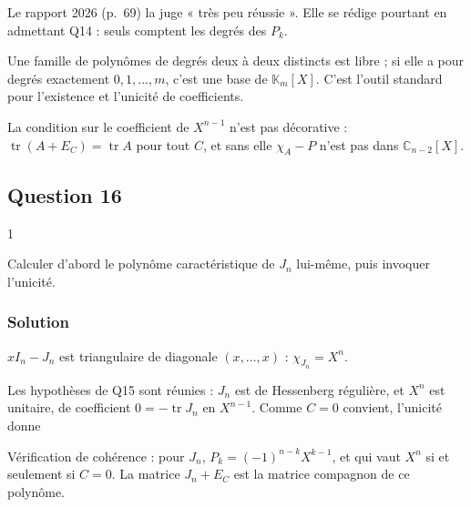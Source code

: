 \documentclass[11pt,a4paper]{article}
\newcommand{\equationajustee}[1]{%
  \sbox{\boiteequation}{$\displaystyle #1$}%
  \ifdim\wd\boiteequation>\linewidth
    \[\resizebox{\linewidth}{!}{\usebox{\boiteequation}}\]%
  \else
    \[#1\]%
  \fi}
\begin{document}
\begin{jury}

Le rapport 2026 (p.~69) la juge « très peu réussie ». Elle se rédige pourtant en admettant Q14 : seuls comptent les degrés des \(P_k\).

\end{jury}

\begin{methode}

Une famille de polynômes de degrés deux à deux distincts est libre ; si elle a pour degrés exactement \(0,1,\dots,m\), c'est une base de \(\mathbb K_m[X]\). C'est l'outil standard pour l'existence et l'unicité de coefficients.

\end{methode}

\begin{piege}

La condition sur le coefficient de \(X^{n-1}\) n'est pas décorative : \(\operatorname{tr}(A+E_C)=\operatorname{tr}A\) pour tout \(C\), et sans elle \(\chi_A-P\) n'est pas dans \(\mathbb C_{n-2}[X]\).

\end{piege}

\hypertarget{question-16}{%
\subsection{Question 16}\label{question-16}}

\begin{indication}{1}

Calculer d'abord le polynôme caractéristique de \(J_n\) lui-même, puis invoquer l'unicité.

\end{indication}

\hypertarget{solution-15}{%
\subsubsection{Solution}\label{solution-15}}

\(xI_n-J_n\) est triangulaire de diagonale \((x,\dots,x)\) : \(\chi_{J_n}=X^n\).

Les hypothèses de Q15 sont réunies : \(J_n\) est de Hessenberg régulière, et \(X^n\) est unitaire, de coefficient \(0=-\operatorname{tr}J_n\) en \(X^{n-1}\). Comme \(C=0\) convient, l'unicité donne
\equationajustee{\boxed{C=0.}}

Vérification de cohérence : pour \(J_n\), \(P_k=(-1)^{n-k}X^{k-1}\), et
\equationajustee{\chi_{J_n+E_C}=X^n-\sum_{k=1}^{n-1}c_kX^{k-1},}
qui vaut \(X^n\) si et seulement si \(C=0\). La matrice \(J_n+E_C\) est la matrice compagnon de ce polynôme.
\end{document}

